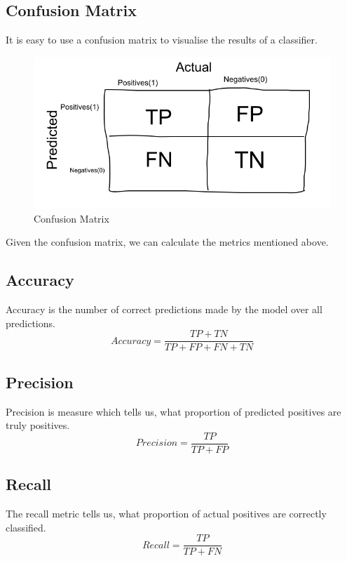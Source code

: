 \documentclass{article}
\begin{document}
\subsection{Confusion Matrix}
It is easy to use a confusion matrix to visualise the results of a classifier.\newline
\begin{figure}[h]
    \centering
    \includegraphics[scale=0.35]{confusion_matrix}
    \caption{Confusion Matrix \cite{metrics}}
    \label{fig:confusion_matrix}
\end{figure}
Given the confusion matrix, we can calculate the metrics mentioned above.

\subsection{Accuracy}
Accuracy is the number of correct predictions made by the model over all predictions.
\begin{equation}
Accuracy = \frac{TP + TN}{TP + FP + FN + TN}
\end{equation}

\subsection{Precision}
Precision is measure which tells us, what proportion of predicted positives are truly positives.
\begin{equation}
Precision = \frac{TP}{TP + FP}
\end{equation}

\subsection{Recall}
The recall metric tells us, what proportion of actual positives are correctly classified.
\begin{equation}
Recall = \frac{TP}{TP + FN}
\end{equation}
\end{document}
